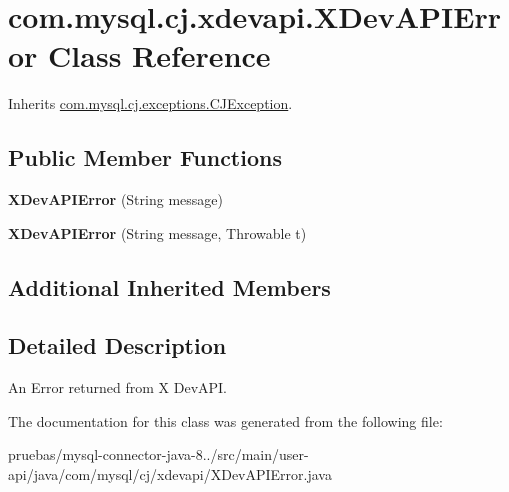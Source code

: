 \hypertarget{classcom_1_1mysql_1_1cj_1_1xdevapi_1_1_x_dev_a_p_i_error}{}\section{com.\+mysql.\+cj.\+xdevapi.\+X\+Dev\+A\+P\+I\+Error Class Reference}
\label{classcom_1_1mysql_1_1cj_1_1xdevapi_1_1_x_dev_a_p_i_error}


Inherits \mbox{\hyperlink{classcom_1_1mysql_1_1cj_1_1exceptions_1_1_c_j_exception}{com.\+mysql.\+cj.\+exceptions.\+C\+J\+Exception}}.

\subsection*{Public Member Functions}
\begin{DoxyCompactItemize}
\item 
\mbox{\label{classcom_1_1mysql_1_1cj_1_1xdevapi_1_1_x_dev_a_p_i_error_a61748bc5d161aef562084a9225c0aa5f}} 
{\bfseries X\+Dev\+A\+P\+I\+Error} (String message)
\item 
\mbox{\label{classcom_1_1mysql_1_1cj_1_1xdevapi_1_1_x_dev_a_p_i_error_a243e94b6be20401c3a4ff7a9dc472a9c}} 
{\bfseries X\+Dev\+A\+P\+I\+Error} (String message, Throwable t)
\end{DoxyCompactItemize}
\subsection*{Additional Inherited Members}


\subsection{Detailed Description}
An Error returned from X Dev\+A\+PI. 

The documentation for this class was generated from the following file\+:\begin{DoxyCompactItemize}
\item 
pruebas/mysql-\/connector-\/java-\/8../src/main/user-\/api/java/com/mysql/cj/xdevapi/X\+Dev\+A\+P\+I\+Error.\+java\end{DoxyCompactItemize}

